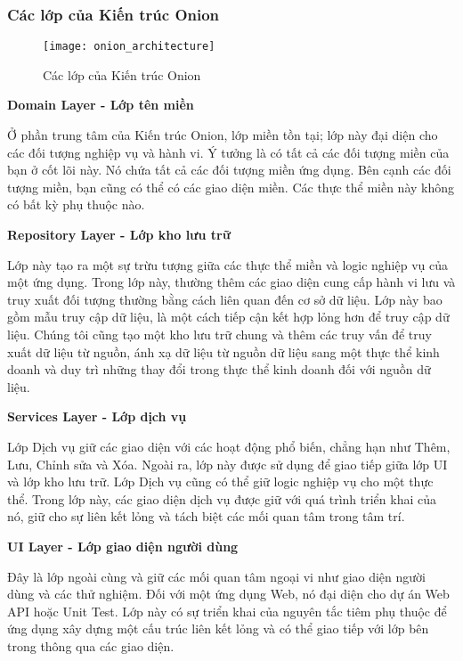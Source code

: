 \subsubsection{Các lớp của Kiến trúc Onion}

\begin{figure}[ht]
	\centering
	\texttt{[image: onion\_architecture]}
	\caption{Các lớp của Kiến trúc Onion}
\end{figure}

\textbf{Domain Layer - Lớp tên miền}

Ở phần trung tâm của Kiến trúc Onion, lớp miền tồn tại; lớp này đại diện cho các đối tượng nghiệp vụ và hành vi. Ý tưởng là có tất cả các đối tượng miền của bạn ở cốt lõi này. Nó chứa tất cả các đối tượng miền ứng dụng. Bên cạnh các đối tượng miền, bạn cũng có thể có các giao diện miền. Các thực thể miền này không có bất kỳ phụ thuộc nào.

\textbf{Repository Layer - Lớp kho lưu trữ}

Lớp này tạo ra một sự trừu tượng giữa các thực thể miền và logic nghiệp vụ của một ứng dụng. Trong lớp này, thường thêm các giao diện cung cấp hành vi lưu và truy xuất đối tượng thường bằng cách liên quan đến cơ sở dữ liệu. Lớp này bao gồm mẫu truy cập dữ liệu, là một cách tiếp cận kết hợp lỏng hơn để truy cập dữ liệu. Chúng tôi cũng tạo một kho lưu trữ chung và thêm các truy vấn để truy xuất dữ liệu từ nguồn, ánh xạ dữ liệu từ nguồn dữ liệu sang một thực thể kinh doanh và duy trì những thay đổi trong thực thể kinh doanh đối với nguồn dữ liệu.

\textbf{Services Layer - Lớp dịch vụ}

Lớp Dịch vụ giữ các giao diện với các hoạt động phổ biến, chẳng hạn như Thêm, Lưu, Chỉnh sửa và Xóa. Ngoài ra, lớp này được sử dụng để giao tiếp giữa lớp UI và lớp kho lưu trữ. Lớp Dịch vụ cũng có thể giữ logic nghiệp vụ cho một thực thể. Trong lớp này, các giao diện dịch vụ được giữ với quá trình triển khai của nó, giữ cho sự liên kết lỏng và tách biệt các mối quan tâm trong tâm trí.

\textbf{UI Layer - Lớp giao diện người dùng}

Đây là lớp ngoài cùng và giữ các mối quan tâm ngoại vi như giao diện người dùng và các thử nghiệm. Đối với một ứng dụng Web, nó đại diện cho dự án Web API hoặc Unit Test. Lớp này có sự triển khai của nguyên tắc tiêm phụ thuộc để ứng dụng xây dựng một cấu trúc liên kết lỏng và có thể giao tiếp với lớp bên trong thông qua các giao diện.

